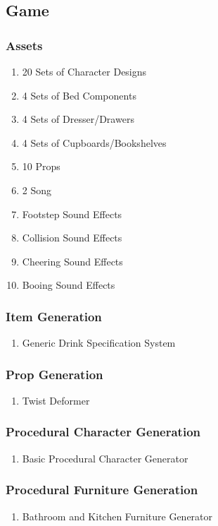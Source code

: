 \subsection{Game}
\subsubsection{Assets}
\begin{enumerate}
\item 20 Sets of Character Designs
\item 4 Sets of Bed Components
\item 4 Sets of Dresser/Drawers
\item 4 Sets of Cupboards/Bookshelves
\item 10 Props
\item 2 Song
\item Footstep Sound Effects
\item Collision Sound Effects
\item Cheering Sound Effects
\item Booing Sound Effects
\end{enumerate}
\subsubsection{Item Generation}
\begin{enumerate}
\item Generic Drink Specification System
\end{enumerate}
\subsubsection{Prop Generation}
\begin{enumerate}
\item Twist Deformer
\end{enumerate}
\subsubsection{Procedural Character Generation}
\begin{enumerate}
\item Basic Procedural Character Generator
\end{enumerate}
\subsubsection{Procedural Furniture Generation}
\begin{enumerate}
\item Bathroom and Kitchen Furniture Generator
\end{enumerate}
